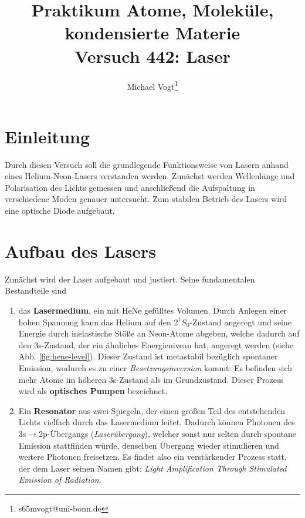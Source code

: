 \documentclass{article}
\title{Praktikum Atome, Moleküle, kondensierte Materie \\ Versuch 442: Laser}
\author[1]{Michael Vogt\thanks{s65mvogt@uni-bonn.de}}
\affil[1]{Uni Bonn}
\newcommand{\defc}{black}
\newcommand{\colorT}[2][blue]{\color{#1}{#2}\color{\defc}}
\newcommand{\todo}[1]{\colorT[red]{\textbf{(#1)}}}
\begin{document}
\maketitle
\tableofcontents
\newpage
{}

\pagestyle{fancy}
\fancyhead[R]{\thepage}
\fancyhead[L]{\leftmark}

  

\section*{Einleitung}
Durch diesen Versuch soll die grundlegende Funktionsweise von Lasern anhand eines Helium-Neon-Lasers verstanden werden.
Zunächst werden Wellenlänge und Polarisation des Lichts gemessen und anschließend die Aufspaltung in verschiedene
Moden genauer untersucht. Zum stabilen Betrieb des Lasers wird eine optische Diode aufgebaut.

\section{Aufbau des Lasers}
Zunächst wird der Laser aufgebaut und justiert. Seine fundamentalen Bestandteile sind
\begin{enumerate}
  \item das \textbf{Lasermedium}, ein mit HeNe gefülltes Volumen. Durch Anlegen einer hohen Spannung kann das Helium
  auf den $2^1S_0$-Zustand angeregt und seine Energie durch inelastische Stöße an Neon-Atome abgeben,
  welche dadurch auf den 3s-Zustand, der ein ähnliches Energieniveau hat, angeregt werden (siehe Abb. \ref{fig:hene-level}).
  Dieser Zustand ist metastabil bezüglich spontaner Emission, wodurch es zu einer \textit{Besetzungsinversion} kommt: 
  Es befinden sich mehr Atome im höheren 3s-Zustand als im Grundzustand.
  Dieser Prozess wird als \textbf{optisches Pumpen} bezeichnet.
  \item Ein \textbf{Resonator} aus zwei Spiegeln, der einen großen Teil des entstehenden Lichts vielfach durch das
  Lasermedium leitet. Dadurch können Photonen des 3s$\rightarrow$2p-Übergangs (\textit{Laserübergang}),
  welcher sonst nur selten durch spontane Emission stattfinden würde, denselben Übergang wieder
  stimulieren und weitere Photonen freisetzen. Es findet also ein verstärkender Prozess statt, der dem Laser
  seinen Namen gibt: \textit{Light Amplification Through Stimulated Emission of Radiation}.
\end{enumerate}
\end{document}
